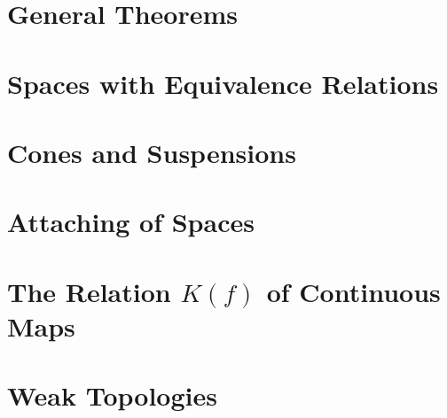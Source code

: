 \section{General Theorems}

\section{Spaces with Equivalence Relations}

\section{Cones and Suspensions}

\section{Attaching of Spaces}

\section{The Relation \(K(f)\) of Continuous Maps}

\section{Weak Topologies}
